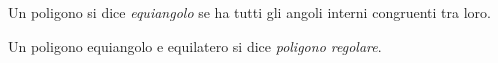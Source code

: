 \begin{definizione}
Un poligono si dice \emph{equiangolo} se ha tutti gli angoli interni 
congruenti tra loro.
\end{definizione}

\begin{definizione}
Un poligono equiangolo e equilatero si dice \emph{poligono regolare}.
\end{definizione}

\ovalbox{\risolvii \ref{ese:1.125}, \ref{ese:1.126}, \ref{ese:1.127}, 
\ref{ese:1.128}, \ref{ese:1.129}, \ref{ese:1.130}, \ref{ese:1.131}, 
\ref{ese:1.132}, \ref{ese:1.133}, \ref{ese:1.134}}



\begin{comment}

Sappiamo che nel corso degli studi o nell'attività lavorativa possono 
presentarsi problemi di diversa natura: di tipo economico, 
scientifico, sociale; possono riguardare insiemi numerici o figure 
geometriche. La matematica ci può aiutare a risolvere i problemi 
quando essi possono essere tradotti in ``forma matematica'', quando 
cioè è possibile trascrivere in simboli le relazioni che intercorrono 
tra le grandezze presenti nel problema e quando si può costruire, 
tramite queste relazioni, un modello matematico che ci permetta di 
raggiungere la soluzione al quesito.

Affronteremo problemi di tipo algebrico o geometrico, che potranno 
essere formalizzati attraverso equazioni di secondo grado in una sola 
incognita.
Teniamo presente, prima di buttarci nella risoluzione del problema, 
alcuni passi che ci aiuteranno a costruire il modello matematico:
\begin{itemize*}
\item la lettura ``attenta'' del testo al fine di individuare 
l'ambiente del problema, le parole chiave, i dati e le informazioni 
implicite, l'obiettivo;
\item la scelta della grandezza incognita del problema, la 
descrizione dell'insieme in cui si ricerca il suo valore, le 
condizioni che devono essere soddisfatte dall'incognita;
\item la traduzione in ``forma matematica'' delle relazioni che 
intercorrono tra i dati e l'obiettivo, cioè l'individuazione del 
modello matematico (equazione risolvente).
\end{itemize*}
\begin{center}
 
\end{center}


\end{comment}
